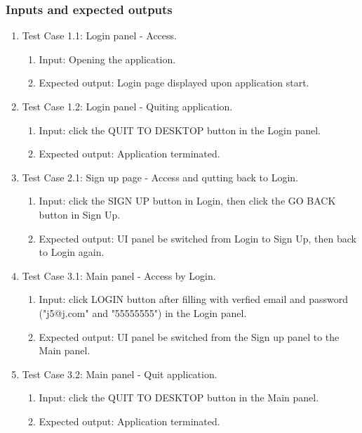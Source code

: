 \documentclass[11pt]{article}
\begin{document}
    \subsubsection*{Inputs and expected outputs}
    \begin{enumerate}
        \item Test Case 1.1: Login panel - Access.
        \begin{enumerate}
            \item  Input: Opening the application.
            \item  Expected output: Login page displayed upon application start.
        \end{enumerate}
        \item Test Case 1.2: Login panel - Quiting application.
        \begin{enumerate}
            \item  Input: click the QUIT TO DESKTOP button in the Login panel.
            \item  Expected output: Application terminated.
        \end{enumerate}
        \item Test Case 2.1: Sign up page - Access and qutting back to Login.
        \begin{enumerate}
            \item  Input: click the SIGN UP button in Login, then click the GO BACK button in Sign Up.
            \item  Expected output: UI panel be switched from Login to Sign Up, then back to Login again.
        \end{enumerate}
        \item Test Case 3.1: Main panel - Access by Login.
        \begin{enumerate}
            \item  Input: click LOGIN button after filling with verfied email and password ("j5@j.com" and "55555555") in the Login panel.
            \item  Expected output: UI panel be switched from the Sign up panel to the Main panel.
        \end{enumerate}
        \item Test Case 3.2: Main panel - Quit application.
        \begin{enumerate}
            \item  Input: click the QUIT TO DESKTOP button in the Main panel.
            \item  Expected output: Application terminated.

\end{enumerate}
\end{enumerate}
\end{document}

